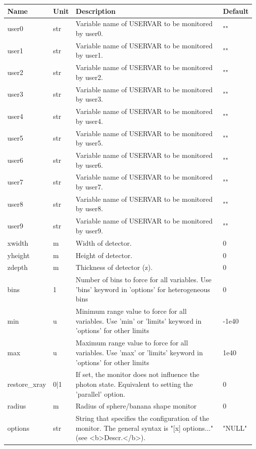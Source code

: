 \begin{longtable}{p{}p{}p{}p{}}
\toprule
\textbf{Name} & \textbf{Unit} & \textbf{Description} & \textbf{Default} \\
\midrule
\endhead
user0 & str & Variable name of USERVAR to be monitored by user0. & "" \\
user1 & str & Variable name of USERVAR to be monitored by user1. & "" \\
user2 & str & Variable name of USERVAR to be monitored by user2. & "" \\
user3 & str & Variable name of USERVAR to be monitored by user3. & "" \\
user4 & str & Variable name of USERVAR to be monitored by user4. & "" \\
user5 & str & Variable name of USERVAR to be monitored by user5. & "" \\
user6 & str & Variable name of USERVAR to be monitored by user6. & "" \\
user7 & str & Variable name of USERVAR to be monitored by user7. & "" \\
user8 & str & Variable name of USERVAR to be monitored by user8. & "" \\
user9 & str & Variable name of USERVAR to be monitored by user9. & "" \\
xwidth & m & Width of detector. & 0 \\
yheight & m & Height of detector. & 0 \\
zdepth & m & Thickness of detector (z). & 0 \\
bins & 1 & Number of bins to force for all variables. Use 'bins' keyword in 'options' for heterogeneous bins & 0 \\
min & u & Minimum range value to force for all variables. Use 'min' or 'limits' keyword in 'options' for other limits & -1e40 \\
max & u & Maximum range value to force for all variables. Use 'max' or 'limits' keyword in 'options' for other limits & 1e40 \\
restore\_xray & 0|1 & If set, the monitor does not influence the photon state. Equivalent to setting the 'parallel' option. & 0 \\
radius & m & Radius of sphere/banana shape monitor & 0 \\
options & str & String that specifies the configuration of the monitor. The general syntax is "[x] options..." (see \textless{}b\textgreater{}Descr.\textless{}/b\textgreater{}). & "NULL" \\

\end{longtable}

